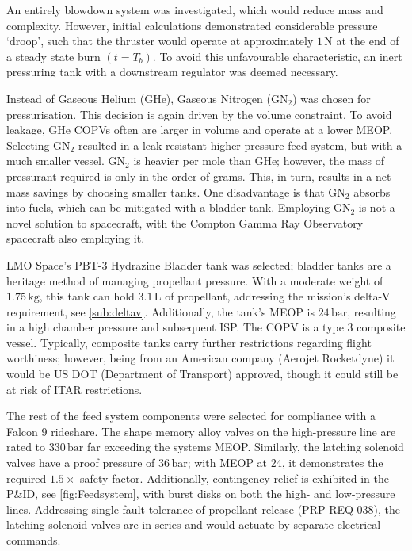 \documentclass[a4paper, 11pt, conference]{IEEEtran}
\begin{document}
An entirely blowdown system was investigated, which would reduce mass and complexity. However, initial calculations demonstrated considerable pressure ‘droop’, such that the thruster would operate at approximately $1\,\mathrm{N}$ at the end of a steady state burn $(t = T_b)$. To avoid this unfavourable characteristic, an inert pressuring tank with a downstream regulator was deemed necessary.

Instead of Gaseous Helium (GHe), Gaseous Nitrogen (GN$_2$) was chosen for pressurisation. This decision is again driven by the volume constraint. To avoid leakage, GHe COPVs often are larger in volume and operate at a lower MEOP. Selecting GN$_2$ resulted in a leak-resistant higher pressure feed system, but with a much smaller vessel. GN$_2$ is heavier per mole than GHe; however, the mass of pressurant required is only in the order of grams. This, in turn, results in a net mass savings by choosing smaller tanks. One disadvantage is that GN$_2$ absorbs into fuels, which can be mitigated with a bladder tank. Employing GN$_2$ is not a novel solution to spacecraft, with the Compton Gamma Ray Observatory spacecraft \cite{NASA1991_GRO_MOR} also employing it.

LMO Space’s PBT-3 Hydrazine Bladder tank was selected; bladder tanks are a heritage method of managing propellant pressure. With a moderate weight of $1.75\,\mathrm{kg}$, this tank can hold $3.1\,\mathrm{L}$ of propellant, addressing the mission’s delta-V requirement, see \autoref{sub:deltav}. Additionally, the tank’s MEOP is $24\,\mathrm{bar}$, resulting in a high chamber pressure and subsequent ISP. The COPV is a type 3 composite vessel. Typically, composite tanks carry further restrictions regarding flight worthiness; however, being from an American company (Aerojet Rocketdyne) it would be US DOT (Department of Transport) approved, though it could still be at risk of ITAR restrictions.

The rest of the feed system components were selected for compliance with a Falcon 9 rideshare. The shape memory alloy valves on the high-pressure line are rated to $330\,\mathrm{bar}$ far exceeding the systems MEOP. Similarly, the latching solenoid valves have a proof pressure of $36\,\mathrm{bar}$; with MEOP at 24, it demonstrates the required $1.5\times$ safety factor. Additionally, contingency relief is exhibited in the P\&ID, see \autoref{fig:Feedsystem}, with burst disks on both the high- and low-pressure lines. Addressing single-fault tolerance of propellant release (PRP-REQ-038), the latching solenoid valves are in series and would actuate by separate electrical commands.
\end{document}
